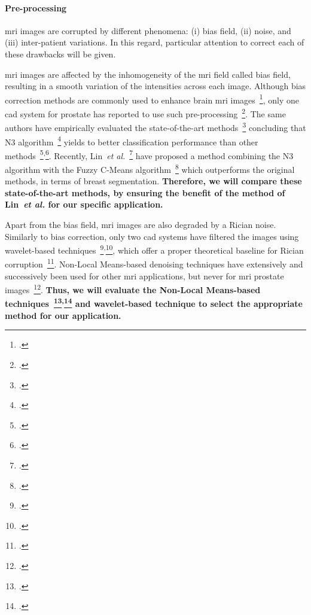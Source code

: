 \paragraph{Pre-processing}

\Ac{mri} images are corrupted by different phenomena: (i) bias field, (ii) noise, and (iii) inter-patient variations.
In this regard, particular attention to correct each of these drawbacks will be given.

\Ac{mri} images are affected by the inhomogeneity of the \ac{mri} field called bias field, resulting in a smooth variation of the intensities across each image.
Although bias correction methods are commonly used to enhance brain \ac{mri} images~\footcite{Vovk2007}, only one \ac{cad} system for prostate has reported to use such pre-processing~\footcite{Viswanath2009}.
The same authors have empirically evaluated the state-of-the-art methods~\footcite{viswanath2011empirical} concluding that N3 algorithm~\footcite{Sled1998} yields to better classification performance than other methods~\footcite{Styner2000}\textsuperscript{,}\footcite{Cohen2000}.
Recently, Lin~\emph{et al.}~\footcite{Lin2011} have proposed a method combining the N3 algorithm with the Fuzzy C-Means algorithm~\footcite{Ahmed2002} which outperforms the original methods, in terms of breast segmentation.
\textbf{Therefore, we will compare these state-of-the-art methods, by ensuring the benefit of the method of Lin~\emph{et al.} for our specific application.}

Apart from the bias field, \Ac{mri} images are also degraded by a Rician noise. 
Similarly to bias correction, only two \ac{cad} systems have filtered the images using wavelet-based techniques~\footcite{Mallat2008}\textsuperscript{,}\footcite{Pizurica2003}, which offer a proper theoretical baseline for Rician corruption~\footcite{Nowak1999}.
Non-Local Means-based denoising techniques have extensively and successively been used for other \ac{mri} applications, but never for \ac{mri} prostate images~\footcite{Manjon2008}.
\textbf{Thus, we will evaluate the Non-Local Means-based techniques~\footcite{Manjon2012}\textsuperscript{,}\footcite{Coupe2011} and wavelet-based technique to select the appropriate method for our application.}

